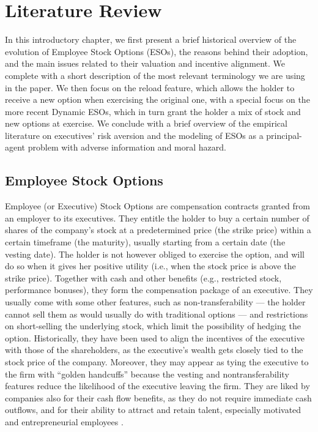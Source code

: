 \section{Literature Review}

In this introductory chapter, we first present a brief historical overview of the evolution of Employee Stock Options (ESOs), the reasons behind their adoption, and the main issues related to their valuation and incentive alignment. We complete with a short description of the most relevant terminology we are using in the paper. We then focus on the reload feature, which allows the holder to receive a new option when exercising the original one, with a special focus on the more recent Dynamic ESOs, which in turn grant the holder a mix of stock and new options at exercise. We conclude with a brief overview of the empirical literature on executives' risk aversion and the modeling of ESOs as a principal-agent problem with adverse information and moral hazard.


\subsection{Employee Stock Options}
Employee (or Executive) Stock Options are compensation contracts granted from an employer to its executives. They entitle the holder to buy a certain number of shares of the company's stock at a predetermined price (the strike price) within a certain timeframe (the maturity), usually starting from a certain date (the vesting date). The holder is not however obliged to exercise the option, and will do so when it gives her positive utility (i.e., when the stock price is above the strike price).
Together with cash and other benefits (e.g., restricted stock, performance bonuses), they form the compensation package of an executive. They usually come with some other features, such as non-transferability --- the holder cannot sell them as would usually do with traditional options --- and restrictions on short-selling the underlying stock, which limit the possibility of hedging the option.
Historically, they have been used to align the incentives of the executive with those of the shareholders, as the executive's wealth gets closely tied to the stock price of the company. Moreover, they may appear as tying the executive to the firm with ``golden handcuffs'' because the vesting and nontransferability features reduce the likelihood of the executive leaving the firm. They are liked by companies also for their cash flow benefits, as they do not require immediate cash outflows, and for their ability to attract and retain talent, especially motivated and entrepreneurial employees \citep{hall2003trouble}.

